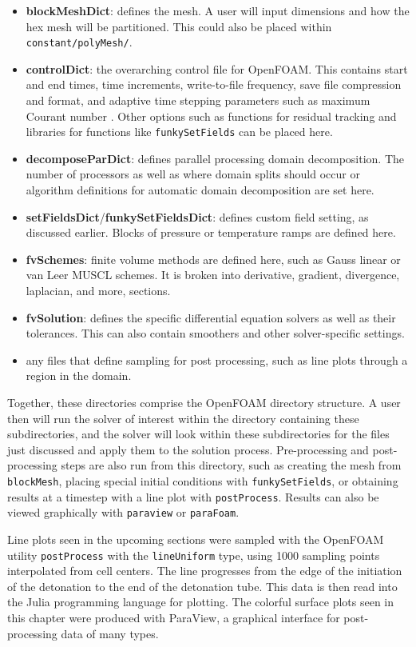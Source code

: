 \begin{itemize}
    \item \textbf{blockMeshDict}: defines the mesh. A user will input dimensions and how the hex mesh will be partitioned. This could also be placed within \verb|constant/polyMesh/|. 
    \item \textbf{controlDict}: the overarching control file for OpenFOAM. This contains start and end times, time increments, write-to-file frequency, save file compression and format, and adaptive time stepping parameters such as maximum Courant number \cite{courant}. Other options such as functions for residual tracking and libraries for functions like \verb|funkySetFields| can be placed here. 
    \item \textbf{decomposeParDict}: defines parallel processing domain decomposition. The number of processors as well as where domain splits should occur or algorithm definitions for automatic domain decomposition are set here. 
    \item \textbf{setFieldsDict}/\textbf{funkySetFieldsDict}: defines custom field setting, as discussed earlier. Blocks of pressure or temperature ramps are defined here. 
    \item \textbf{fvSchemes}: finite volume methods are defined here, such as Gauss linear or van Leer MUSCL schemes. It is broken into derivative, gradient, divergence, laplacian, and more, sections. 
    \item \textbf{fvSolution}: defines the specific differential equation solvers as well as their tolerances. This can also contain smoothers and other solver-specific settings. 
    \item any files that define sampling for post processing, such as line plots through a region in the domain.  
\end{itemize}

Together, these directories comprise the OpenFOAM directory structure. A user then will run the solver of interest within the directory containing these subdirectories, and the solver will look within these subdirectories for the files just discussed and apply them to the solution process. Pre-processing and post-processing steps are also run from this directory, such as creating the mesh from \verb|blockMesh|, placing special initial conditions with \verb|funkySetFields|, or obtaining results at a timestep with a line plot with \verb|postProcess|. Results can also be viewed graphically with \verb|paraview| or \verb|paraFoam|. 

Line plots seen in the upcoming sections were sampled with the OpenFOAM utility \verb|postProcess| with the \verb|lineUniform| type, using 1000 sampling points interpolated from cell centers. The line progresses from the edge of the initiation of the detonation to the end of the detonation tube. This data is then read into the Julia programming language for plotting. The colorful surface plots seen in this chapter were produced with ParaView\cite{paraview}, a graphical interface for post-processing data of many types. 


